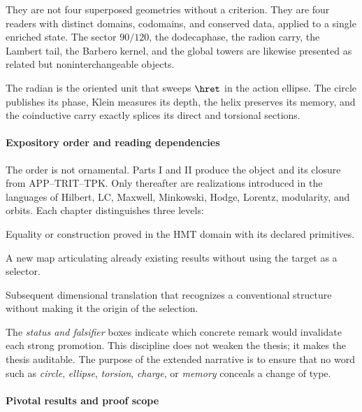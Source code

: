 They are not four superposed geometries without a criterion. They are four readers with distinct domains, codomains, and conserved data, applied to a single enriched state. The sector \(90/120\), the dodecaphase, the radion carry, the Lambert tail, the Barbero kernel, and the global towers are likewise presented as related but noninterchangeable objects.

\begin{thesisbox}
The radian is the oriented unit that sweeps \(\hret\) in the action ellipse.
The circle publishes its phase, Klein measures its depth, the helix preserves its
memory, and the coinductive carry exactly splices its direct and
torsional sections.
\end{thesisbox}

\paragraph{Expository order and reading dependencies}

The order is not ornamental. Parts I and II produce the object and its
closure from APP--TRIT--TPK. Only thereafter are realizations introduced in
the languages of Hilbert, LC, Maxwell, Minkowski, Hodge, Lorentz,
modularity, and orbits. Each chapter distinguishes three levels:

\begin{description}[style=nextline,leftmargin=4.2cm,labelwidth=3.9cm]
\item[Internal result.] Equality or construction proved in the
HMT domain with its declared primitives.
\item[Consolidated formalization.] A new map articulating already
existing results without using the target as a selector.
\item[Physical interface.] Subsequent dimensional translation that recognizes a
conventional structure without making it the origin of the selection.
\end{description}

The \emph{status and falsifier} boxes indicate which concrete remark would invalidate each strong promotion. This discipline does not weaken the thesis; it makes the thesis auditable. The purpose of the extended narrative is to ensure that no word such as \emph{circle}, \emph{ellipse}, \emph{torsion}, \emph{charge}, or \emph{memory} conceals a change of type.

\paragraph{Pivotal results and proof scope}

